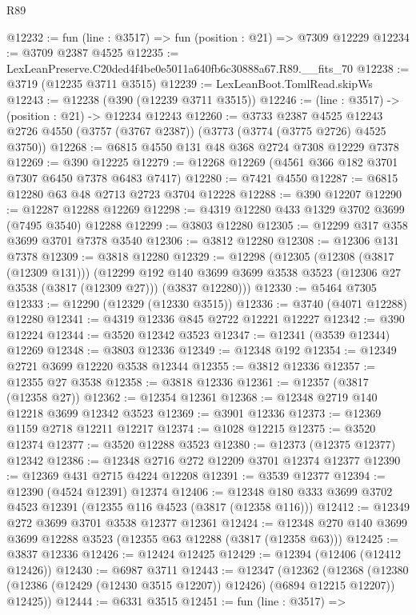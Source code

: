 \begin{lexlean}{R89}
\begin{coremodule}
@12232 := fun (line : @3517) => fun (position : @21) => @7309 @12229
@12234 := @3709 @2387 @4525
@12235 := LexLeanPreserve.C20ded4f4be0e5011a640fb6c30888a67.R89.__fits_70
@12238 := @3719 (@12235 @3711 @3515)
@12239 := LexLeanBoot.TomlRead.skipWs
@12243 := @12238 (@390 (@12239 @3711 @3515))
@12246 := (line : @3517) -> (position : @21) -> @12234 @12243
@12260 := @3733
    @2387
    @4525
    @12243
    @2726
    @4550
    (@3757 (@3767 @2387))
    (@3773 (@3774 (@3775 @2726) @4525 @3750))
@12268 := @6815 @4550 @131 @48 @368 @2724 @7308 @12229 @7378
@12269 := @390 @12225
@12279 := @12268 @12269 (@4561 @366 @182 @3701 @7307 @6450 @7378 @6483 @7417)
@12280 := @7421 @4550
@12287 := @6815 @12280 @63 @48 @2713 @2723 @3704 @12228
@12288 := @390 @12207
@12290 := @12287 @12288 @12269
@12298 := @4319 @12280 @433 @1329 @3702 @3699 (@7495 @3540) @12288
@12299 := @3803 @12280
@12305 := @12299 @317 @358 @3699 @3701 @7378 @3540
@12306 := @3812 @12280
@12308 := @12306 @131 @7378
@12309 := @3818 @12280
@12329 := @12298
    (@12305
      (@12308 (@3817 (@12309 @131)))
      (@12299
        @192
        @140
        @3699
        @3699
        @3538
        @3523
        (@12306 @27 @3538 (@3817 (@12309 @27)))
        (@3837 @12280)))
@12330 := @5464 @7305
@12333 := @12290 (@12329 (@12330 @3515))
@12336 := @3740 (@4071 @12288) @12280
@12341 := @4319 @12336 @845 @2722 @12221 @12227
@12342 := @390 @12224
@12344 := @3520 @12342 @3523
@12347 := @12341 (@3539 @12344) @12269
@12348 := @3803 @12336
@12349 := @12348 @192
@12354 := @12349 @2721 @3699 @12220 @3538 @12344
@12355 := @3812 @12336
@12357 := @12355 @27 @3538
@12358 := @3818 @12336
@12361 := @12357 (@3817 (@12358 @27))
@12362 := @12354 @12361
@12368 := @12348 @2719 @140 @12218 @3699 @12342 @3523
@12369 := @3901 @12336
@12373 := @12369 @1159 @2718 @12211 @12217
@12374 := @1028 @12215
@12375 := @3520 @12374
@12377 := @3520 @12288 @3523
@12380 := @12373 (@12375 @12377) @12342
@12386 := @12348 @2716 @272 @12209 @3701 @12374 @12377
@12390 := @12369 @431 @2715 @4224 @12208
@12391 := @3539 @12377
@12394 := @12390 (@4524 @12391) @12374
@12406 := @12348 @180 @333 @3699 @3702 @4523 @12391 (@12355 @116 @4523 (@3817 (@12358 @116)))
@12412 := @12349 @272 @3699 @3701 @3538 @12377 @12361
@12424 := @12348 @270 @140 @3699 @3699 @12288 @3523 (@12355 @63 @12288 (@3817 (@12358 @63)))
@12425 := @3837 @12336
@12426 := @12424 @12425
@12429 := @12394 (@12406 (@12412 @12426))
@12430 := @6987 @3711
@12443 := @12347
    (@12362
      (@12368 (@12380 (@12386 (@12429 (@12430 @3515 @12207)) @12426) (@6894 @12215 @12207)) @12425))
@12444 := @6331 @3515
@12451 := fun (line : @3517) =>

\end{coremodule}
\end{lexlean}
